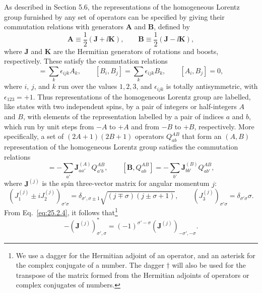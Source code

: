 As described in Section 5.6, the representations of the homogeneous Lorentz
group furnished by any set of operators can be specified by giving their
commutation relations with generators \(\mathbf A\) and \(\mathbf B\),
defined by
\begin{equation}
\mathbf A\equiv\frac12(\mathbf J+\ii\mathbf K),
\qquad
\mathbf B\equiv\frac12(\mathbf J-\ii\mathbf K),
\tag{25.2.1}\label{eq:25.2.1}
\end{equation}
where \(\mathbf J\) and \(\mathbf K\) are the Hermitian generators of
rotations and boosts, respectively. These satisfy the commutation relations
\begin{equation}
[A_i,A_j]=\sum_k\epsilon_{ijk}A_k,
\qquad
[B_i,B_j]=\sum_k\epsilon_{ijk}B_k,
\qquad
[A_i,B_j]=0,
\tag{25.2.2}\label{eq:25.2.2}
\end{equation}
where \(i\), \(j\), and \(k\) run over the values \(1,2,3\), and
\(\epsilon_{ijk}\) is totally antisymmetric, with
\(\epsilon_{123}=+1\). Thus representations of the homogeneous Lorentz
group are labelled, like states with two independent spins, by a pair of
integers or half-integers \(A\) and \(B\), with elements of the
representation labelled by a pair of indices \(a\) and \(b\), which run by
unit steps from \(-A\) to \(+A\) and from \(-B\) to \(+B\), respectively.
More specifically, a set of \((2A+1)(2B+1)\) operators \(Q_{ab}^{AB}\)
that form an \((A,B)\) representation of the homogeneous Lorentz group
satisfies the commutation relations
\begin{equation}
[\mathbf A,Q_{ab}^{AB}]
=-\sum_{a'}\mathbf J_{aa'}^{(A)}Q_{a'b}^{AB},
\qquad
[\mathbf B,Q_{ab}^{AB}]
=-\sum_{b'}\mathbf J_{bb'}^{(B)}Q_{ab'}^{AB},
\tag{25.2.3}\label{eq:25.2.3}
\end{equation}
where \(\mathbf J^{(j)}\) is the spin three-vector matrix for angular
momentum \(j\):
\begin{equation}
\left(J_1^{(j)}\mathbin{\pm}iJ_2^{(j)}\right)_{\sigma'\sigma}
=\delta_{\sigma',\sigma\pm1}
\sqrt{(j\mp\sigma)(j\pm\sigma+1)},
\qquad
\left(J_3^{(j)}\right)_{\sigma'\sigma}
=\delta_{\sigma'\sigma}\sigma.
\tag{25.2.4}\label{eq:25.2.4}
\end{equation}
From Eq.~\eqref{eq:25.2.4}, it follows that\footnote{We use a dagger for
the Hermitian adjoint of an operator, and an asterisk for the complex
conjugate of a number. The dagger \(\dagger\) will also be used for the
transpose of the matrix formed from the Hermitian adjoints of operators or
complex conjugates of numbers.}
\begin{equation}
-\left(\mathbf J^{(j)}\right)_{\sigma',\sigma}^{*}
=(-1)^{\sigma'-\sigma}
\left(\mathbf J^{(j)}\right)_{-\sigma',-\sigma}.
\tag{25.2.5}\label{eq:25.2.5}
\end{equation}
